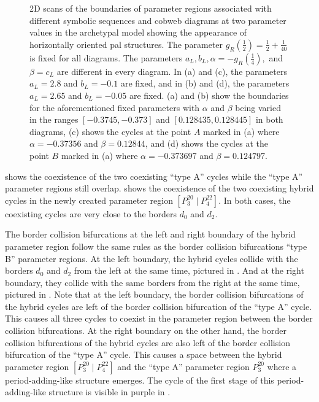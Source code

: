 \begin{figure}
{		\label{fig:add.change.appa.vert.cobweb.B}
	}
	\caption[2D scans of the boundaries of parameter regions associated with different symbolic sequences and cobweb diagrams at two parameter values in the archetypal model showing the appearance of horizontally oriented period-adding-like structures]{
		2D scans of the boundaries of parameter regions associated with different symbolic sequences and cobweb diagrams at two parameter values in the archetypal model showing the appearance of horizontally oriented \gls{pal} structures.
		The parameter $g_R\left(\frac{1}{2}\right) = \frac{1}{2} + \frac{1}{40}$ is fixed for all diagrams.
		The parameters $a_L, b_L, \alpha = -g_R\left(\frac{1}{4}\right),$ and $\beta = c_L$ are different in every diagram.
		In (a) and (c), the parameters $a_L = 2.8$ and $b_L = -0.1$ are fixed, and in (b) and (d), the parameters $a_L = 2.65$ and $b_L = -0.05$ are fixed.
		(a) and (b) show the boundaries for the aforementioned fixed parameters with $\alpha$ and $\beta$ being varied in the ranges $[-0.3745, -0.373]$ and $[0.128435, 0.128445]$ in both diagrams,
		(c) shows the cycles at the point $A$ marked in (a) where $\alpha = -0.37356$ and $\beta = 0.12844$,
		and (d) shows the cycles at the point $B$ marked in (a) where $\alpha = -0.373697$ and $\beta = 0.124797$.
	}
\end{figure}

 shows the coexistence of the two coexisting ``type A'' cycles while the ``type A'' parameter regions still overlap.
 shows the coexistence of the two coexisting hybrid cycles in the newly created parameter region $\left[P^{20}_3 \mid P^{22}_4\right]$.
In both cases, the coexisting cycles are very close to the borders $d_0$ and $d_2$.

The border collision bifurcations at the left and right boundary of the hybrid parameter region follow the same rules as the border collision bifurcations ``type B'' parameter regions.
At the left boundary, the hybrid cycles collide with the borders $d_0$ and $d_2$ from the left at the same time, pictured in .
And at the right boundary, they collide with the same borders from the right at the same time, pictured in .
Note that at the left boundary, the border collision bifurcations of the hybrid cycles are left of the border collision bifurcation of the ``type A'' cycle.
This causes all three cycles to coexist in the parameter region between the border collision bifurcations.
At the right boundary on the other hand, the border collision bifurcations of the hybrid cycles are also left of the border collision bifurcation of the ``type A'' cycle.
This causes a space between the hybrid parameter region $\left[P^{20}_3 \mid P^{22}_4\right]$ and the ``type A'' parameter region $P^{20}_3$ where a period-adding-like structure emerges.
The cycle of the first stage of this period-adding-like structure is visible in purple in .

